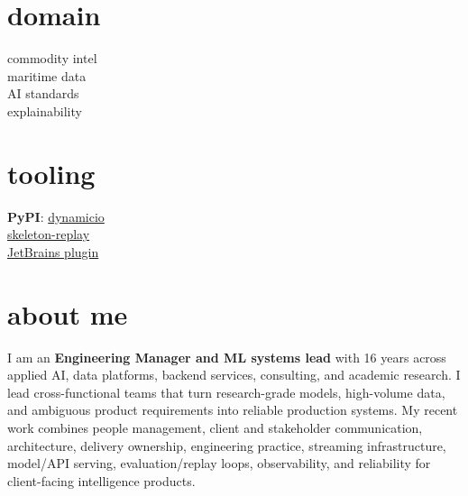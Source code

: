 \documentclass[]{../../../../friggeri-cv}
\begin{document}
\begin{aside}
    \section{domain}
        {\footnotesize commodity intel\\maritime data\\AI standards\\explainability}
    \section{tooling}
        {\footnotesize \textbf{PyPI}: \href{https://pypi.org/project/dynamicio/}{dynamicio}\\\href{https://pypi.org/project/skeleton-replay/}{skeleton-replay}\\\href{https://plugins.jetbrains.com/plugin/32807-skeleton-replay}{JetBrains plugin}}
\end{aside}

\section{about me}
{\normalsize I am an \textbf{Engineering Manager and ML systems lead} with 16 years across applied AI, data platforms, backend services, consulting, and academic research. I lead cross-functional teams that turn research-grade models, high-volume data, and ambiguous product requirements into reliable production systems. My recent work combines people management, client and stakeholder communication, architecture, delivery ownership, engineering practice, streaming infrastructure, model/API serving, evaluation/replay loops, observability, and reliability for client-facing intelligence products.}
\end{document}
